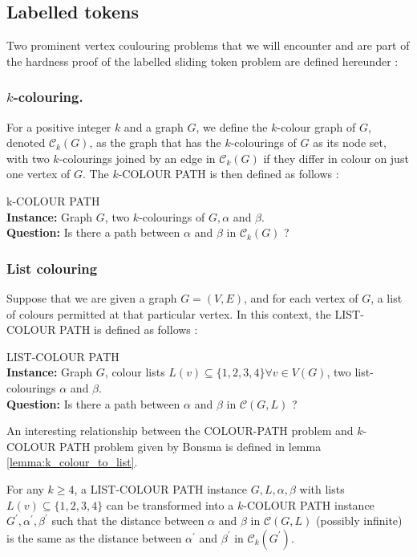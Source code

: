 \subsection{Labelled tokens} \label{subsection:coloring_problems}
Two prominent vertex coulouring problems that we will encounter and are part of the hardness proof of the labelled sliding token problem
are defined hereunder :

\subsubsection{$k$-colouring.}
For a positive integer $k$ and a graph $G$, we define the $k$-colour graph of $G$, denoted $\mathcal{C}_{k}(G)$,
as the graph that has the $k$-colourings of $G$ as its node set, with two $k$-colourings joined by an edge in $\mathcal{C}_{k}(G)$ if they differ
in colour on just one vertex of $G$. The $k$-COLOUR PATH is then defined as follows :
\begin{flushleft}
    k-COLOUR PATH \\
    \textbf{Instance: } Graph $G$, two $k$-colourings of $G, \alpha$ and $\beta$. \\
    \textbf{Question: } Is there a path between $\alpha$ and $\beta$ in $\mathcal{C}_{k}(G)$ ? \\
\end{flushleft}

\subsubsection{List colouring}
Suppose that we are given a graph $G=(V,E)$, and for each vertex of $G$, a list of colours permitted at that particular vertex.
In this context, the LIST-COLOUR PATH is defined as follows :
\begin{flushleft}
    LIST-COLOUR PATH \\
    \textbf{Instance: } Graph $G$, colour lists $L(v) \subseteq \{1,2,3,4\} \forall v \in V(G)$, two list-colourings $\alpha$ and $\beta$. \\
    \textbf{Question: } Is there a path between $\alpha$ and $\beta$ in $\mathcal{C}(G,L)$ ? \\
\end{flushleft}

An interesting relationship between the COLOUR-PATH problem and $k$-COLOUR PATH problem given by Bonsma is defined in lemma \ref{lemma:k_colour_to_list}.
\begin{lemma}\cite{bonsma}\label{lemma:k_colour_to_list}
For any $k \geq 4$, a LIST-COLOUR PATH instance $G, L, \alpha, \beta$ with lists $L(v) \subseteq \{1, 2, 3, 4\}$ can be transformed
into a $k$-COLOUR PATH instance $G^{'}, \alpha^{'}, \beta^{'}$ such that the distance between $\alpha$ and $\beta$ in $\mathcal{C}(G, L)$
(possibly infinite) is the same as the distance between $\alpha^{'}$ and $\beta^{'}$ in $\mathcal{C}_k(G^{'})$.
\end{lemma}

